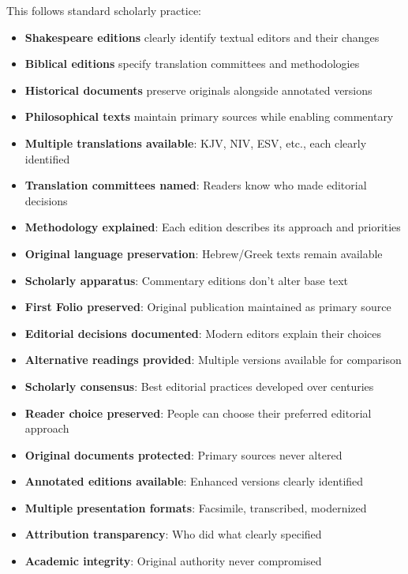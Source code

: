 \documentclass[12pt,twoside]{book}
\begin{document}
This follows standard scholarly practice:
\begin{itemize}
\item \textbf{\textbf{Shakespeare editions}} clearly identify textual editors and their changes
\item \textbf{\textbf{Biblical editions}} specify translation committees and methodologies
\item \textbf{\textbf{Historical documents}} preserve originals alongside annotated versions
\item \textbf{\textbf{Philosophical texts}} maintain primary sources while enabling commentary

\item \textbf{\textbf{Multiple translations available}}: KJV, NIV, ESV, etc., each clearly identified
\item \textbf{\textbf{Translation committees named}}: Readers know who made editorial decisions
\item \textbf{\textbf{Methodology explained}}: Each edition describes its approach and priorities
\item \textbf{\textbf{Original language preservation}}: Hebrew/Greek texts remain available
\item \textbf{\textbf{Scholarly apparatus}}: Commentary editions don't alter base text

\item \textbf{\textbf{First Folio preserved}}: Original publication maintained as primary source
\item \textbf{\textbf{Editorial decisions documented}}: Modern editors explain their choices
\item \textbf{\textbf{Alternative readings provided}}: Multiple versions available for comparison
\item \textbf{\textbf{Scholarly consensus}}: Best editorial practices developed over centuries
\item \textbf{\textbf{Reader choice preserved}}: People can choose their preferred editorial approach

\item \textbf{\textbf{Original documents protected}}: Primary sources never altered
\item \textbf{\textbf{Annotated editions available}}: Enhanced versions clearly identified
\item \textbf{\textbf{Multiple presentation formats}}: Facsimile, transcribed, modernized
\item \textbf{\textbf{Attribution transparency}}: Who did what clearly specified
\item \textbf{\textbf{Academic integrity}}: Original authority never compromised


\end{itemize}
\end{document}
